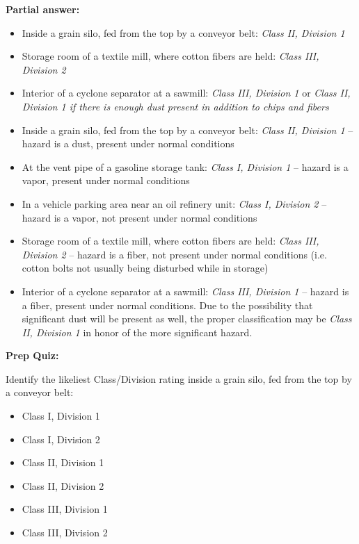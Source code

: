 \noindent
{\bf Partial answer:}

\begin{itemize}
\item{} Inside a grain silo, fed from the top by a conveyor belt: {\it Class II, Division 1}
\vskip 5pt
\item{} Storage room of a textile mill, where cotton fibers are held: {\it Class III, Division 2}
\vskip 5pt
\item{} Interior of a cyclone separator at a sawmill: {\it Class III, Division 1} or {\it Class II, Division 1 if there is enough dust present in addition to chips and fibers}
\end{itemize}







\begin{itemize}
\item{} Inside a grain silo, fed from the top by a conveyor belt: {\it Class II, Division 1} -- hazard is a dust, present under normal conditions
\vskip 5pt
\item{} At the vent pipe of a gasoline storage tank: {\it Class I, Division 1} -- hazard is a vapor, present under normal conditions
\vskip 5pt
\item{} In a vehicle parking area near an oil refinery unit: {\it Class I, Division 2} -- hazard is a vapor, not present under normal conditions
\vskip 5pt
\item{} Storage room of a textile mill, where cotton fibers are held: {\it Class III, Division 2} -- hazard is a fiber, not present under normal conditions (i.e. cotton bolts not usually being disturbed while in storage)
\vskip 5pt
\item{} Interior of a cyclone separator at a sawmill: {\it Class III, Division 1} -- hazard is a fiber, present under normal conditions.  Due to the possibility that significant dust will be present as well, the proper classification may be {\it Class II, Division 1} in honor of the more significant hazard.
\end{itemize}


\vfil \eject

\noindent
{\bf Prep Quiz:}

Identify the likeliest Class/Division rating inside a grain silo, fed from the top by a conveyor belt:

\begin{itemize}
\item{} Class I, Division 1 
\vskip 5pt 
\item{} Class I, Division 2 
\vskip 5pt 
\item{} Class II, Division 1
\vskip 5pt 
\item{} Class II, Division 2 
\vskip 5pt 
\item{} Class III, Division 1
\vskip 5pt 
\item{} Class III, Division 2
\end{itemize}



